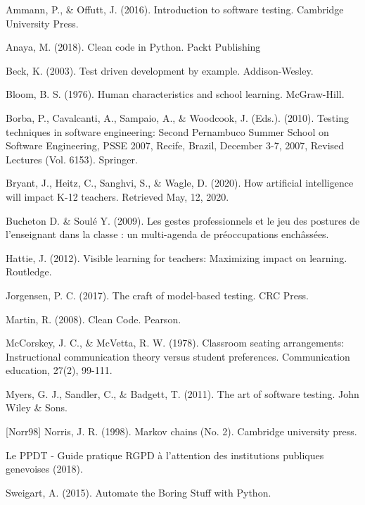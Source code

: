 \documentclass[10pt]{article}
\begin{document}
\begin{thebibliography}{Xyzz12}

 Ammann, P., \& Offutt, J. (2016). Introduction to software testing. Cambridge University Press.

 Anaya, M. (2018). Clean code in Python. Packt Publishing

 Beck, K. (2003). Test driven development by example. Addison-Wesley.

 Bloom, B. S. (1976). Human characteristics and school learning. McGraw-Hill.

 Borba, P., Cavalcanti, A., Sampaio, A., \& Woodcook, J. (Eds.). (2010). Testing techniques in software engineering: Second Pernambuco Summer School on Software Engineering, PSSE 2007, Recife, Brazil, December 3-7, 2007, Revised Lectures (Vol. 6153). Springer.

 Bryant, J., Heitz, C., Sanghvi, S., \& Wagle, D. (2020). How artificial intelligence will impact K-12 teachers. Retrieved May, 12, 2020.

 Bucheton D. \& Soulé Y. (2009). Les gestes professionnels et le jeu des postures de l’enseignant dans la classe : un multi-agenda de préoccupations enchâssées.

 Hattie, J. (2012). Visible learning for teachers: Maximizing impact on learning. Routledge.

 Jorgensen, P. C. (2017). The craft of model-based testing. CRC Press.

 Martin, R. (2008). Clean Code. Pearson.

 McCorskey, J. C., \& McVetta, R. W. (1978). Classroom seating arrangements: Instructional communication theory versus student preferences. Communication education, 27(2), 99-111.

 Myers, G. J., Sandler, C., \& Badgett, T. (2011). The art of software testing. John Wiley \& Sons.

[Norr98] Norris, J. R. (1998). Markov chains (No. 2). Cambridge university press.

 Le PPDT - Guide pratique RGPD à l'attention des institutions publiques genevoises (2018).

 Sweigart, A. (2015). Automate the Boring Stuff with Python.
\end{thebibliography}
\end{document}

